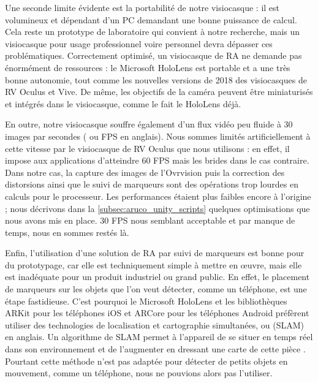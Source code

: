 Une seconde limite évidente est la portabilité de notre visiocasque  : il est volumineux et dépendant d'un PC demandant une bonne puissance de calcul. Cela reste un prototype de laboratoire qui convient à notre recherche, mais un visiocasque pour usage professionnel voire personnel devra dépasser ces problématiques. Correctement optimisé, un visiocasque de RA ne demande pas énormément de ressources : le Microsoft HoloLens est portable et a une très bonne autonomie, tout comme les nouvelles versions de 2018 des visiocasques de RV Oculus et Vive. De même, les objectifs de la caméra peuvent être miniaturisés et intégrés dans le visiocasque, comme le fait le HoloLens déjà.


En outre, notre visiocasque souffre également d'un flux vidéo peu fluide à 30 images par secondes ( ou FPS en anglais). Nous sommes limités artificiellement à cette vitesse par le visiocasque de RV Oculus que nous utilisons : en effet, il impose aux applications d'atteindre 60 FPS mais les brides dans le cas contraire. Dans notre cas, la capture des images de l'Ovrvision puis la correction des distorsions ainsi que le suivi de marqueurs sont des opérations trop lourdes en calculs pour le processeur. Les performances étaient plus faibles encore à l'origine ; nous décrivons dans la \autoref{subsec:aruco_unity_scripts} quelques optimisations que nous avons mis en place. 30 FPS nous semblant acceptable et par manque de temps, nous en sommes restés là.


Enfin, l'utilisation d'une solution de RA par suivi de marqueurs est bonne pour du prototypage, car elle est techniquement simple à mettre en \oe uvre, mais elle est inadéquate pour un produit industriel ou grand public. En effet, le placement de marqueurs sur les objets que l'on veut détecter, comme un téléphone, est une étape fastidieuse. C'est pourquoi le Microsoft HoloLens et les bibliothèques ARKit pour les téléphones iOS et ARCore pour les téléphones Android préfèrent utiliser des technologies de localisation et cartographie simultanées, ou  (SLAM) en anglais. Un algorithme de SLAM permet à l'appareil de se situer en temps réel dans son environnement et de l'augmenter en dressant une carte de cette pièce . Pourtant cette méthode n'est pas adaptée pour détecter de petits objets en mouvement, comme un téléphone, nous ne pouvions alors pas l'utiliser.

